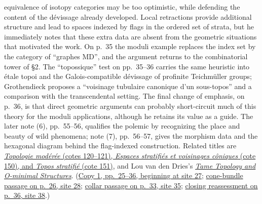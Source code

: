 \documentclass[11pt,a4paper]{article}
\begin{document}
equivalence of isotopy categories may be too optimistic, while defending
the content of the dévissage already developed. Local retractions provide
additional structure and lead to spaces indexed by flags in the ordered
set of strata, but he immediately notes that these extra data are absent
from the geometric situations that motivated the work. On p.~35 the
moduli example replaces the index set by the category of ``graphes MD'',
and the argument returns to the combinatorial tower of \S2. The
``topossique'' test on pp.~35--36 carries the same heuristic into étale
topoi and the Galois-compatible dévissage of profinite Teichmüller groups;
Grothendieck proposes a ``voisinage tubulaire canonique d'un sous-topos''
and a comparison with the transcendental setting. The final change of
emphasis, on p.~36, is that direct geometric arguments can probably
short-circuit much of this theory for the moduli applications, although
he retains its value as a guide. The later note (6), pp.~55--56,
qualifies the polemic by recognizing the place and beauty of wild
phenomena; note (7), pp.~56--57, gives the morphism data and the hexagonal
diagram behind the flag-indexed construction. Related titles are
\href{https://grothendieck.umontpellier.fr/archives-grothendieck/}{\emph{Topologie modérée} (cotes 120--121), \emph{Espaces stratifiés et voisinages côniques} (cote 150), and \emph{Topos stratifié} (cote 151)},
and Lou van den Dries's
\href{https://assets.cambridge.org/97805215/98385/frontmatter/9780521598385_frontmatter.pdf}{\emph{Tame Topology and O-minimal Structures}}.
(\href{https://grothendieck.umontpellier.fr/web/viewer.html?file=../119.pdf\#page=28}{Copy 1, pp.~25--36, beginning at site 27};
\href{https://grothendieck.umontpellier.fr/web/viewer.html?file=../119.pdf\#page=29}{cone-bundle passage on p.~26, site 28};
\href{https://grothendieck.umontpellier.fr/web/viewer.html?file=../119.pdf\#page=36}{collar passage on p.~33, site 35};
\href{https://grothendieck.umontpellier.fr/web/viewer.html?file=../119.pdf\#page=39}{closing reassessment on p.~36, site 38}.)
\end{document}
